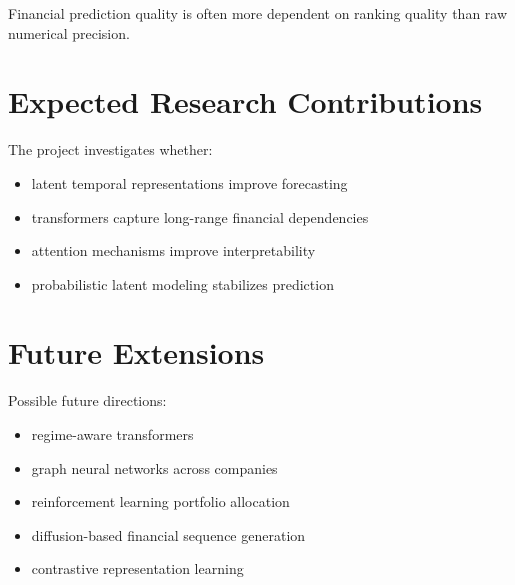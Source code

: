 \documentclass[11pt]{article}
\begin{document}
Financial prediction quality is often more dependent on ranking quality than raw numerical precision.

\section{Expected Research Contributions}

The project investigates whether:
\begin{itemize}
    \item latent temporal representations improve forecasting
    \item transformers capture long-range financial dependencies
    \item attention mechanisms improve interpretability
    \item probabilistic latent modeling stabilizes prediction
\end{itemize}

\section{Future Extensions}

Possible future directions:
\begin{itemize}
    \item regime-aware transformers
    \item graph neural networks across companies
    \item reinforcement learning portfolio allocation
    \item diffusion-based financial sequence generation
    \item contrastive representation learning
\end{itemize}
\end{document}
